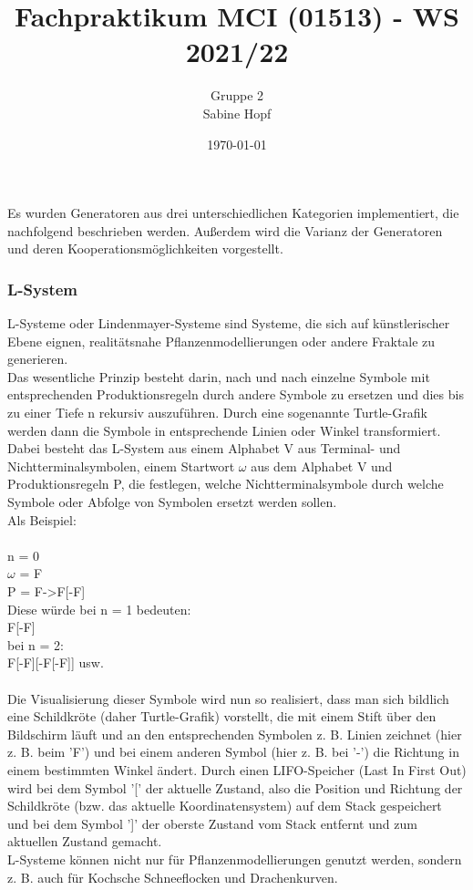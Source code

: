 \documentclass[../mciAusarbeitung.tex]{subfiles}
\title{Fachpraktikum MCI (01513) - WS 2021/22}
\author{Gruppe 2\\
	Sabine Hopf}
\date{\today}
\begin{document}
	Es wurden Generatoren aus drei unterschiedlichen Kategorien implementiert, die nachfolgend beschrieben werden. Außerdem wird die Varianz der Generatoren und deren Kooperationsmöglichkeiten vorgestellt.\\
	\subsubsection{L-System}
		L-Systeme oder Lindenmayer-Systeme sind Systeme, die sich auf künstlerischer Ebene eignen, realitätsnahe Pflanzenmodellierungen oder andere Fraktale zu generieren. \\
		Das wesentliche Prinzip besteht darin, nach und nach einzelne Symbole mit entsprechenden Produktionsregeln durch andere Symbole zu ersetzen und dies bis zu einer Tiefe n rekursiv auszuführen. Durch eine sogenannte Turtle-Grafik werden dann die Symbole in entsprechende Linien oder Winkel transformiert.
		Dabei besteht das L-System aus einem Alphabet V aus Terminal- und Nichtterminalsymbolen, einem Startwort $\omega  $ aus dem Alphabet V und Produktionsregeln P, die festlegen, welche Nichtterminalsymbole durch welche Symbole oder Abfolge von Symbolen ersetzt werden sollen.\\
		Als Beispiel:\\
		\\
		n = 0\\
		$ \omega $ = F\\
		P = F->F[-F]\\
		Diese würde bei n = 1 bedeuten:\\
		F[-F]\\
		bei n = 2:\\
		F[-F][-F[-F]] usw.\\
		\\
		Die Visualisierung dieser Symbole wird nun so realisiert, dass man sich bildlich eine Schildkröte (daher Turtle-Grafik) vorstellt, die mit einem Stift über den Bildschirm läuft und an den entsprechenden Symbolen z. B. Linien zeichnet (hier z. B. beim 'F') und bei einem anderen Symbol (hier z. B. bei '-') die Richtung in einem bestimmten Winkel ändert. Durch einen LIFO-Speicher (Last In First Out) wird bei dem Symbol '[' der aktuelle Zustand, also die Position und Richtung der Schildkröte (bzw. das aktuelle Koordinatensystem) auf dem  Stack gespeichert und bei dem Symbol ']' der oberste Zustand vom Stack entfernt und zum aktuellen Zustand gemacht.\\
		L-Systeme können nicht nur für Pflanzenmodellierungen genutzt werden, sondern z. B. auch für Kochsche Schneeflocken und Drachenkurven.\\
\end{document}
